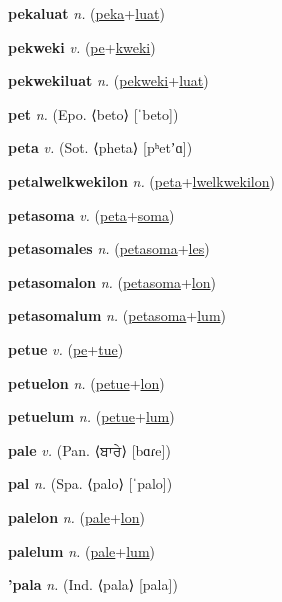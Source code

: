 \textbf{\hypertarget{pekaluat}{pekaluat}} \textit{n.} (\hyperlink{peka}{peka}+\allowbreak \hyperlink{luat}{luat})


\textbf{\hypertarget{pekweki}{pekweki}} \textit{v.} (\hyperlink{pe}{pe}+\allowbreak \hyperlink{kweki}{kweki})


\textbf{\hypertarget{pekwekiluat}{pekwekiluat}} \textit{n.} (\hyperlink{pekweki}{pekweki}+\allowbreak \hyperlink{luat}{luat})


\textbf{\hypertarget{pet}{pet}} \textit{n.} (Epo. ⟨beto⟩ [ˈbeto])


\textbf{\hypertarget{peta}{peta}} \textit{v.} (Sot. ⟨pheta⟩ [pʰetʼɑ])


\textbf{\hypertarget{petalwelkwekilon}{petalwelkwekilon}} \textit{n.} (\hyperlink{peta}{peta}+\allowbreak \hyperlink{lwelkwekilon}{lwelkwekilon})


\textbf{\hypertarget{petasoma}{petasoma}} \textit{v.} (\hyperlink{peta}{peta}+\allowbreak \hyperlink{soma}{soma})


\textbf{\hypertarget{petasomales}{petasomales}} \textit{n.} (\hyperlink{petasoma}{petasoma}+\allowbreak \hyperlink{les}{les})


\textbf{\hypertarget{petasomalon}{petasomalon}} \textit{n.} (\hyperlink{petasoma}{petasoma}+\allowbreak \hyperlink{lon}{lon})


\textbf{\hypertarget{petasomalum}{petasomalum}} \textit{n.} (\hyperlink{petasoma}{petasoma}+\allowbreak \hyperlink{lum}{lum})


\textbf{\hypertarget{petue}{petue}} \textit{v.} (\hyperlink{pe}{pe}+\allowbreak \hyperlink{tue}{tue})


\textbf{\hypertarget{petuelon}{petuelon}} \textit{n.} (\hyperlink{petue}{petue}+\allowbreak \hyperlink{lon}{lon})


\textbf{\hypertarget{petuelum}{petuelum}} \textit{n.} (\hyperlink{petue}{petue}+\allowbreak \hyperlink{lum}{lum})


\textbf{\hypertarget{pale}{pale}} \textit{v.} (Pan. ⟨{\gurmukhi{}ਬਾਰੇ}⟩ [bɑɾe])


\textbf{\hypertarget{pal}{pal}} \textit{n.} (Spa. ⟨palo⟩ [ˈpalo])


\textbf{\hypertarget{palelon}{palelon}} \textit{n.} (\hyperlink{pale}{pale}+\allowbreak \hyperlink{lon}{lon})


\textbf{\hypertarget{palelum}{palelum}} \textit{n.} (\hyperlink{pale}{pale}+\allowbreak \hyperlink{lum}{lum})


\textbf{\hypertarget{'pala}{'pala}} \textit{n.} (Ind. ⟨pala⟩ [pala])


